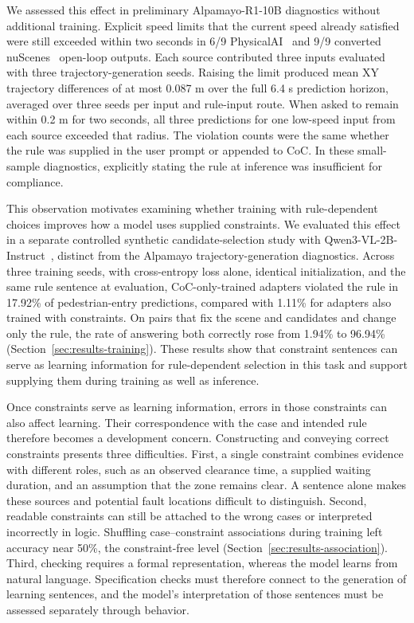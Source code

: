 We assessed this effect in preliminary Alpamayo-R1-10B diagnostics without additional training. Explicit speed limits that the current speed already satisfied were still exceeded within two seconds in 6/9 PhysicalAI~\cite{nvidia2025physicalai} and 9/9 converted nuScenes~\cite{caesar2020nuscenes} open-loop outputs. Each source contributed three inputs evaluated with three trajectory-generation seeds. Raising the limit produced mean XY trajectory differences of at most 0.087 m over the full 6.4 s prediction horizon, averaged over three seeds per input and rule-input route. When asked to remain within 0.2 m for two seconds, all three predictions for one low-speed input from each source exceeded that radius. The violation counts were the same whether the rule was supplied in the user prompt or appended to CoC. In these small-sample diagnostics, explicitly stating the rule at inference was insufficient for compliance.\par

This observation motivates examining whether training with rule-dependent choices improves how a model uses supplied constraints. We evaluated this effect in a separate controlled synthetic candidate-selection study with Qwen3-VL-2B-Instruct~\cite{qwen2025qwen3vl2b}, distinct from the Alpamayo trajectory-generation diagnostics. Across three training seeds, with cross-entropy loss alone, identical initialization, and the same rule sentence at evaluation, CoC-only-trained adapters violated the rule in 17.92\% of pedestrian-entry predictions, compared with 1.11\% for adapters also trained with constraints. On pairs that fix the scene and candidates and change only the rule, the rate of answering both correctly rose from 1.94\% to 96.94\% (Section~\ref{sec:results-training}). These results show that constraint sentences can serve as learning information for rule-dependent selection in this task and support supplying them during training as well as inference.\par

Once constraints serve as learning information, errors in those constraints can also affect learning. Their correspondence with the case and intended rule therefore becomes a development concern. Constructing and conveying correct constraints presents three difficulties. First, a single constraint combines evidence with different roles, such as an observed clearance time, a supplied waiting duration, and an assumption that the zone remains clear. A sentence alone makes these sources and potential fault locations difficult to distinguish. Second, readable constraints can still be attached to the wrong cases or interpreted incorrectly in logic. Shuffling case--constraint associations during training left accuracy near 50\%, the constraint-free level (Section~\ref{sec:results-association}). Third, checking requires a formal representation, whereas the model learns from natural language. Specification checks must therefore connect to the generation of learning sentences, and the model's interpretation of those sentences must be assessed separately through behavior.\par

